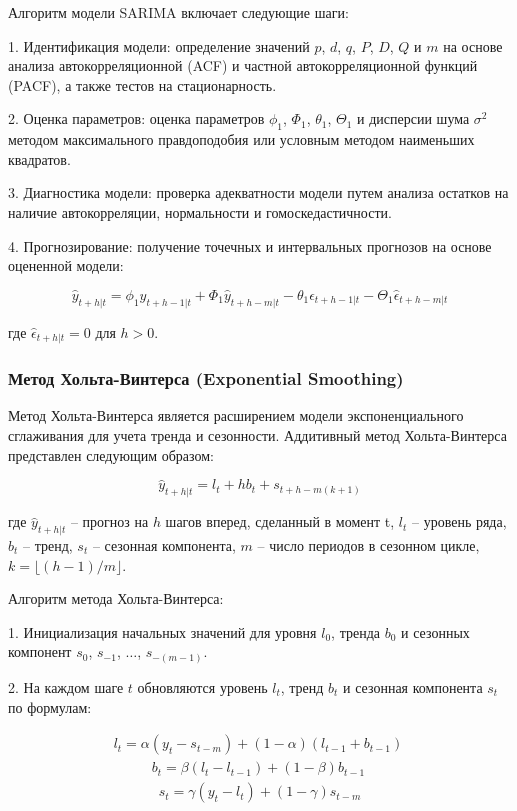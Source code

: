 Алгоритм модели SARIMA включает следующие шаги:

1. Идентификация модели: определение значений $p$, $d$, $q$, $P$, $D$, $Q$ и $m$ на основе анализа автокорреляционной (ACF) и частной автокорреляционной функций (PACF), а также тестов на стационарность.

2. Оценка параметров: оценка параметров $\phi_1$, $\Phi_1$, $\theta_1$, $\Theta_1$ и дисперсии шума $\sigma^2$ методом максимального правдоподобия или условным методом наименьших квадратов.

3. Диагностика модели: проверка адекватности модели путем анализа остатков на наличие автокорреляции, нормальности и гомоскедастичности.

4. Прогнозирование: получение точечных и интервальных прогнозов на основе оцененной модели:

\begin{equation}
\hat{y}_{t+h|t} = \phi_1 \hat{y}_{t+h-1|t} + \Phi_1 \hat{y}_{t+h-m|t} - \theta_1 \hat{\epsilon}_{t+h-1|t} - \Theta_1 \hat{\epsilon}_{t+h-m|t}
\end{equation}

где $\hat{\epsilon}_{t+h|t} = 0$ для $h > 0$.

\subsubsection{Метод Хольта-Винтерса (Exponential Smoothing)}

Метод Хольта-Винтерса является расширением модели экспоненциального сглаживания для учета тренда и сезонности. Аддитивный метод Хольта-Винтерса представлен следующим образом:

\begin{equation}
\hat{y}_{t+h|t} = l_t + h b_t + s_{t+h-m(k+1)}
\end{equation}

где $\hat{y}_{t+h|t}$ -- прогноз на $h$ шагов вперед, сделанный в момент t, $l_t$ -- уровень ряда, $b_t$ -- тренд, $s_t$ -- сезонная компонента, $m$ -- число периодов в сезонном цикле, $k = \lfloor(h-1)/m\rfloor$.

Алгоритм метода Хольта-Винтерса:

1. Инициализация начальных значений для уровня $l_0$, тренда $b_0$ и сезонных компонент $s_0$, $s_{-1}$, $\ldots$, $s_{-(m-1)}$.

2. На каждом шаге $t$ обновляются уровень $l_t$, тренд $b_t$ и сезонная компонента $s_t$ по формулам:

\begin{align}
l_t = \alpha(y_t - s_{t-m}) + (1-\alpha)(l_{t-1} + b_{t-1})\
\end{align}
\begin{align}
b_t = \beta(l_t - l_{t-1}) + (1-\beta)b_{t-1}\
\end{align}
\begin{align}
s_t = \gamma(y_t - l_t) + (1-\gamma)s_{t-m}
\end{align}

